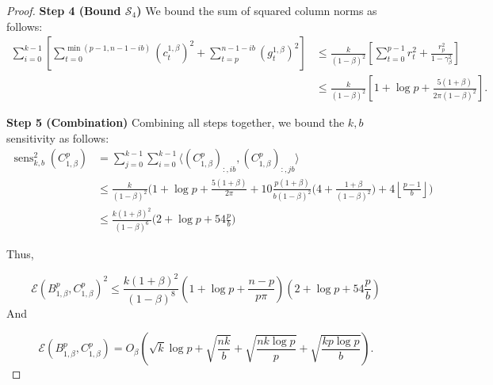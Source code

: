 \documentclass{article} %
\newcommand{\senskb}{\operatorname{sens}_{k, b}}
\begin{document}
\begin{proof}
\textbf{Step 4 (Bound $\mathcal{S}_4$)}
We bound the sum of squared column norms  as follows: 
\begin{equation}
\begin{aligned}
     \sum\limits_{i = 0}^{k - 1}\left[\sum\limits_{t = 0}^{\min(p -1, n - 1 - ib)}(c^{1,\beta}_t)^2 + \sum\limits_{t = p}^{n - 1 - ib} (g^{1,\beta}_{t})^2\right] &\le \frac{k}{(1 - \beta)^2}\left[\sum\limits_{t = 0}^{p - 1} r_t^2  + \frac{r_p^2}{1 - \gamma_{\beta}^2}\right]\\
     &\le  \frac{k}{(1 - \beta)^2}\left[1 + \log p + \frac{5 ( 1 + \beta)}{2\pi (1 - \beta)^2}\right].
\end{aligned}
\end{equation}

\textbf{Step 5 (Combination)} Combining all steps together, we bound the $k, b$ sensitivity as follows:
\begin{equation}
\begin{aligned}
    \senskb^2(C_{1, \beta}^p) &= \sum\limits_{j = 0}^{k - 1}\sum\limits_{i = 0}^{k - 1} \langle (C_{1, \beta}^p)_{:,ib}, (C_{1, \beta}^p)_{:,jb} \rangle\\
    &\le \frac{k}{(1 - \beta)^2} \bigg(1 + \log p + \frac{5(1 + \beta)}{2\pi} + 10\frac{p(1 + \beta)}{b(1 - \beta)^2}\bigg(4 + \frac{1 + \beta}{(1 - \beta)^2}\bigg)  +  4\left\lfloor\frac{p - 1}{b}\right\rfloor\bigg)\\
    &\le \frac{k(1 + \beta)^2}{(1 - \beta)^6}\bigg(2 + \log p + 54 \frac{p}{b} \bigg)
\end{aligned}
\end{equation}

Thus,

\begin{equation}
    \mathcal{E}( B_{1, \beta}^p, C_{1,\beta}^{p})^2 \le \frac{k(1 + \beta)^2}{(1 - \beta)^8}\left(1 + \log p + \frac{n - p}{p\pi}\right)\left(2 + \log p + 54 \frac{p}{b} \right)
\end{equation}
And 

\begin{equation}
    \mathcal{E}( B_{1,\beta}^p, C_{1, \beta}^{p}) = O_{\beta}\left(\sqrt{k}\log p + \sqrt{\frac{nk}{b}} + \sqrt{\frac{nk\log p}{p}} + \sqrt{\frac{kp\log p}{b}}\right).
\end{equation}
\end{proof}

\OptimalBandInv*
\end{document}
